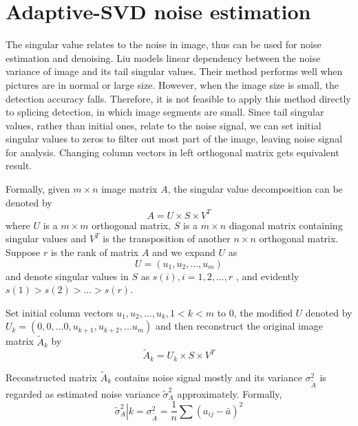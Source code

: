 \documentclass[a4paper, 12pt, twoside]{report}
\begin{document}
\section{Adaptive-SVD noise estimation}\label{s2a}
The singular value relates to the noise in image, thus can be used for noise estimation and denoising\cite{RN136}. Liu \cite{RN54} models linear dependency between the noise variance of image and its tail singular values. Their method performs well when pictures are in normal or large size. However, when the image size is small, the detection accuracy falls. Therefore, it is not feasible to apply this method directly to splicing detection, in which image segments are small. Since tail singular values, rather than initial ones, relate to the noise signal, we can set initial singular values to zeros to filter out most part of the image, leaving noise signal for analysis. Changing column vectors in left orthogonal matrix gets equivalent result.

Formally, given $m\times n$ image matrix $A$, the singular value decomposition can be denoted by
\begin{equation}
	A=U\times S\times {{V}^{T}}
\end{equation}
where $U$ is a $m\times m$ orthogonal matrix, $S$ is a $m\times n$ diagonal matrix containing singular values and ${{V}^{T}}$ is the transposition of  another $n\times n$ orthogonal matrix. Suppose $r$ is the rank of matrix $A$ and we expand $U$ as \[U=({{u}_{1}},{{u}_{2}},...,{{u}_{m}})\]and denote singular values in $S$ as $s(i),i=1,2,...,r$ , and evidently $s(1)>s(2)>...>s(r)$. 

Set initial column vectors ${{u}_{1}},{{u}_{2}},...,{{u}_{k}},1<k<m$ to 0, the modified $U$ denoted by ${{U}_{k}}=(0,0,...0,{{u}_{k+1}},{{u}_{k+2}},...{{u}_{m}})$ and then reconstruct the original image matrix ${{\tilde{A}}_{k}}$ by 
\begin{equation}
	{{\tilde{A}}_{k}}={{U}_{k}}\times S\times {{V}^{T}}
	\label{svdequation}
\end{equation}

Reconstructed matrix ${{\tilde{A}}_{k}}$ contains noise signal mostly and its variance ${{\sigma }_{{\tilde{A}}}^{2}}$ is regarded as estimated noise variance $\tilde{\sigma }_{A}^{2}$ approximately. Formally,
\begin{equation}
	\left. \tilde{\sigma }_{A}^{2} \right|k=\sigma _{{\tilde{A}}}^{2}=\frac{1}{n}\sum{{{({{a}_{ij}}-\bar{a})}^{2}}}
\end{equation}
\end{document}

